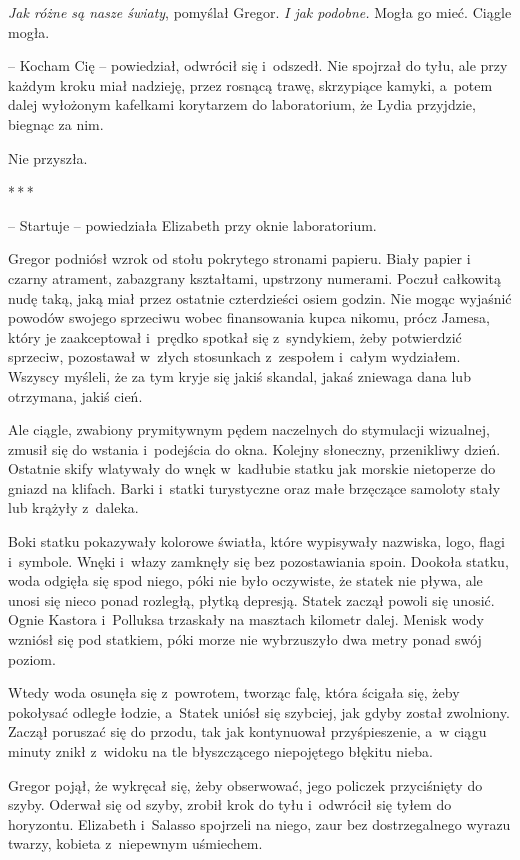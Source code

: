 \documentclass[oneside,polish,12pt,sfheadings]{mwbk}
\newcommand{\threeast}{\bigskip\par\centerline{*\,*\,*}\medskip\par}%
\begin{document}
\emph{Jak różne są nasze światy}, pomyślał Gregor. \emph{I jak podobne.
} Mogła go mieć. Ciągle mogła.

-- Kocham Cię -- powiedział, odwrócił się i~odszedł. Nie spojrzał do tyłu,
ale przy każdym kroku miał nadzieję, przez rosnącą trawę, skrzypiące
kamyki, a~potem dalej wyłożonym kafelkami korytarzem do laboratorium, że
Lydia przyjdzie, biegnąc za nim.

Nie przyszła.

\threeast

-- Startuje -- powiedziała Elizabeth przy oknie laboratorium.

Gregor podniósł wzrok od stołu pokrytego stronami papieru. Biały papier
i czarny atrament, zabazgrany kształtami, upstrzony numerami. Poczuł
całkowitą nudę taką, jaką miał przez ostatnie czterdzieści osiem godzin.
Nie mogąc wyjaśnić powodów swojego sprzeciwu wobec finansowania kupca
nikomu, prócz Jamesa, który je zaakceptował i~prędko spotkał się z~syndykiem, żeby potwierdzić sprzeciw, pozostawał w~złych stosunkach z~zespołem i~całym wydziałem. Wszyscy myśleli, że za tym kryje się jakiś
skandal, jakaś zniewaga dana lub otrzymana, jakiś cień.

Ale ciągle, zwabiony prymitywnym pędem naczelnych do stymulacji
wizualnej, zmusił się do wstania i~podejścia do okna. Kolejny słoneczny,
przenikliwy dzień. Ostatnie skify wlatywały do wnęk w~kadłubie statku
jak morskie nietoperze do gniazd na klifach. Barki i~statki turystyczne
oraz małe brzęczące samoloty stały lub krążyły z~daleka.

Boki statku pokazywały kolorowe światła, które wypisywały nazwiska,
logo, flagi i~symbole. Wnęki i~włazy zamknęły się bez pozostawiania
spoin. Dookoła statku, woda odgięła się spod niego, póki nie było
oczywiste, że statek nie pływa, ale unosi się nieco ponad rozległą,
płytką depresją. Statek zaczął powoli się unosić. Ognie Kastora i~Polluksa trzaskały na masztach kilometr dalej. Menisk wody wzniósł się
pod statkiem, póki morze nie wybrzuszyło dwa metry ponad swój poziom.

Wtedy woda osunęła się z~powrotem, tworząc falę, która ścigała się, żeby
pokołysać odległe łodzie, a~Statek uniósł się szybciej, jak gdyby został
zwolniony. Zaczął poruszać się do przodu, tak jak kontynuował
przyśpieszenie, a~w ciągu minuty znikł z~widoku na tle błyszczącego
niepojętego błękitu nieba.

Gregor pojął, że wykręcał się, żeby obserwować, jego policzek
przyciśnięty do szyby. Oderwał się od szyby, zrobił krok do tyłu i~odwrócił się tyłem do horyzontu. Elizabeth i~Salasso spojrzeli na niego,
zaur bez dostrzegalnego wyrazu twarzy, kobieta z~niepewnym uśmiechem.
\end{document}
